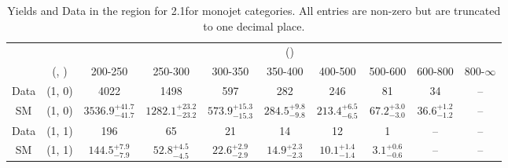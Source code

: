 \begin{table}[h!]
\tiny
\centering
\caption{Yields and Data in the \mj region for 2.1\ifb for monojet categories. All entries are non-zero but are truncated to one decimal place.\label{tab:yieldsallqcd_mu_comb_mono}}
\begin{tabular}
{cccccccccc}
	\hline\hline
	&	& \multicolumn{8}{c}{\scalht (\gev)}\\ 
	&	 (\njet, \nb) & 200-250 & 250-300 & 300-350 & 350-400 & 400-500 & 500-600 & 600-800 & 800-$\infty$ \\ [0.8ex] 
\hline
	Data & (1, 0) & 4022 & 1498 & 597 & 282 & 246 & 81 & 34 & -- \\[0.5ex] 
	SM & (1, 0) & $3536.9^{+ 41.7 }_{- 41.7 }$ & $1282.1^{+ 23.2 }_{- 23.2 }$ & $573.9^{+ 15.3 }_{- 15.3 }$ & $284.5^{+ 9.8 }_{- 9.8 }$ & $213.4^{+ 6.5 }_{- 6.5 }$ & $67.2^{+ 3.0 }_{- 3.0 }$ & $36.6^{+ 1.2 }_{- 1.2 }$ & -- \\[0.5ex] 
	Data & (1, 1) & 196 & 65 & 21 & 14 & 12 & 1 & -- & -- \\[0.5ex] 
	SM & (1, 1) & $144.5^{+ 7.9 }_{- 7.9 }$ & $52.8^{+ 4.5 }_{- 4.5 }$ & $22.6^{+ 2.9 }_{- 2.9 }$ & $14.9^{+ 2.3 }_{- 2.3 }$ & $10.1^{+ 1.4 }_{- 1.4 }$ & $3.1^{+ 0.6 }_{- 0.6 }$ & -- & -- \\[0.5ex] 
	\hline
	\hline
\end{tabular}
\end{table}
